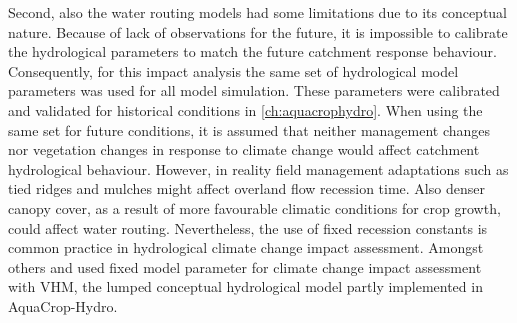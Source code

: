 Second, also the water routing models had some limitations due to its conceptual nature. Because of lack of observations for the future, it is impossible to calibrate the hydrological parameters to match the future catchment response behaviour. Consequently, for this impact analysis the same set of hydrological model parameters was used for all model simulation. These parameters were calibrated and validated for historical conditions in \autoref{ch:aquacrophydro}.  When using the same set for future conditions, it is assumed that neither management changes nor vegetation changes in response to climate change would affect catchment hydrological behaviour. However, in reality field management adaptations such as tied ridges and mulches might affect overland flow recession time. Also denser canopy cover, as a result of more favourable climatic conditions for crop growth, could affect water routing. Nevertheless, the use of fixed recession constants is common practice in hydrological climate change impact assessment. Amongst others \textcite{taye2011} and \textcite{vansteenbergen2012} used fixed model parameter for climate change impact assessment with VHM, the lumped conceptual hydrological model partly implemented in AquaCrop-Hydro. 

